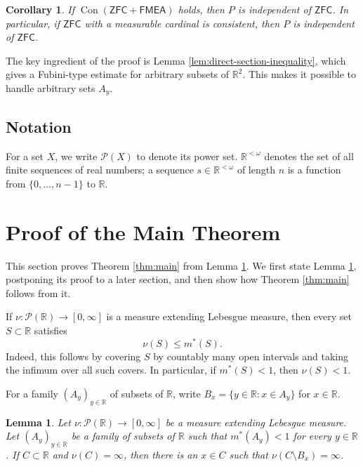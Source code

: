 \documentclass{amsart}
\theoremstyle{plain}
\newtheorem{lemma}[theorem]{Lemma}
\newtheorem{corollary}[theorem]{Corollary}
\theoremstyle{definition}
\newcommand{\R}{\mathbb{R}}
\newcommand{\Pc}{\mathcal{P}}
\newcommand{\ZFC}{\mathsf{ZFC}}
\newcommand{\FMEA}{\mathsf{FMEA}}
\newcommand{\Con}{\operatorname{Con}}
\begin{document}
\begin{corollary}\label{cor:relative-independence}
If $\Con(\ZFC+\FMEA)$ holds, then $P$ is independent of $\ZFC$.
In particular, if $\ZFC$ with a measurable cardinal is consistent, then $P$ is independent of $\ZFC$.
\end{corollary}

The key ingredient of the proof is Lemma \ref{lem:direct-section-inequality}, which gives a Fubini-type estimate for arbitrary subsets of $\R^2$.
This makes it possible to handle arbitrary sets $A_y$.

\subsection*{Notation}

For a set $X$, we write $\Pc(X)$ to denote its power set.
$\R^{<\omega}$ denotes the set of all finite sequences of real numbers; a sequence $s\in\R^{<\omega}$ of length $n$ is a function from $\{0,\ldots,n-1\}$ to $\R$.

\section{Proof of the Main Theorem}\label{sec:main-theorem-proof}

This section proves Theorem \ref{thm:main} from Lemma \ref{lem:key-selection}.
We first state Lemma \ref{lem:key-selection}, postponing its proof to a later section, and then show how Theorem \ref{thm:main} follows from it.

If $\nu:\Pc(\R)\to[0,\infty]$ is a measure extending Lebesgue measure, then every set $S\subset\R$ satisfies
\begin{equation}\label{eq:outer-measure-domination}
\nu(S)\le m^*(S).
\end{equation}
Indeed, this follows by covering $S$ by countably many open intervals and taking the infimum over all such covers.
In particular, if $m^*(S)<1$, then $\nu(S)<1$.

For a family $(A_y)_{y\in\R}$ of subsets of $\R$, write $B_x=\{y\in\R:x\in A_y\}$ for $x\in\R$.

\begin{lemma}\label{lem:key-selection}
Let $\nu:\Pc(\R)\to[0,\infty]$ be a measure extending Lebesgue measure.
Let $(A_y)_{y\in\R}$ be a family of subsets of $\R$ such that $m^*(A_y)<1$ for every $y\in\R$.
If $C\subset\R$ and $\nu(C)=\infty$, then there is an $x\in C$ such that $\nu(C\setminus B_x)=\infty$.
\end{lemma}
\end{document}
